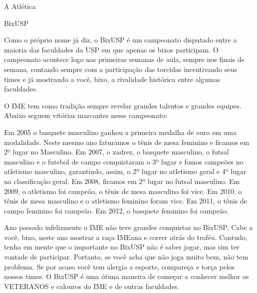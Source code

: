 \begin{secao}{A Atlética}
\begin{subsecao}{BixUSP}

Como o próprio nome já diz, o BixUSP é um campeonato disputado entre a maioria
das faculdades da USP em que apenas os bixos participam. O campeonato acontece logo nas primeiras semanas de aula, sempre nos finais de semana, 
contando sempre com a participação das torcidas incentivando seus times 
e já mostrando a você, bixo, a rivalidade histórica entre algumas faculdades.

O IME tem como tradição sempre revelar grandes talentos e grandes equipes.
Abaixo seguem vitórias marcantes nesse campeonato:



Em 2005 o basquete masculino ganhou a primeira medalha de ouro em uma modalidade. Neste mesmo ano faturamos o tênis
de mesa feminino e ficamos em 2º lugar no Masculino. Em 2007, o xadrez, o 
basquete masculino, o futsal masculino e o futebol de campo conquistaram o 
3º lugar e fomos campeões no atletismo masculino, garantindo, assim, o 
2º lugar no atletismo geral e 4º lugar na classificação geral. Em 2008,
ficamos em 2º lugar no futsal masculino. Em 2009, o atletismo foi campeão, 
o tênis de mesa masculino foi vice. Em 2010, o tênis de mesa masculino e o 
atletismo feminino foram vice. Em 2011, o tênis de campo feminino foi campeão. 
Em 2012, o basquete feminino foi campeão.

Ano passado infelizmente o IME não teve grandes conquistas no BixUSP.
Cabe a você, bixo, neste ano mostrar a raça IMEana e correr atrás do troféu.
Contudo, tenha em mente que o importante no BixUSP não é saber jogar, 
mas sim ter vontade de participar.
Portanto, se você acha que não joga muito bem, não tem problema. Se por acaso
você tem alergia a esporte, compareça e torça pelos nossos times. O BixUSP é uma
ótima maneira de começar a conhecer melhor os VETERANOS e calouros do
IME e de outras faculdades.


\end{subsecao}
\end{secao}
